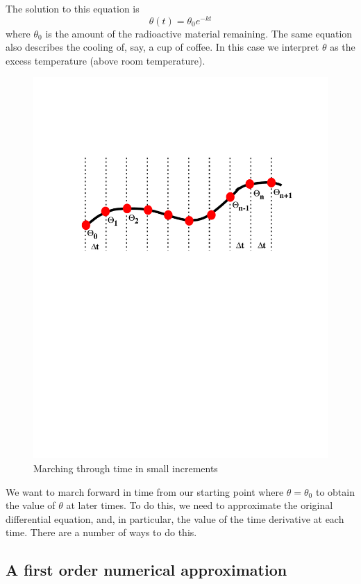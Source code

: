 \documentclass[10pt]{article}
\begin{document}
	The solution to this equation is
		\begin{equation}
			\theta(t) = \theta_0 e^{-kt}
		\end{equation}	
	where $\theta_0$ is the amount of the radioactive material remaining.
	The same equation also describes the cooling of, say, a cup of coffee. In this
	case we interpret $\theta$ as the excess temperature (above room temperature).
	
		\begin{figure}[h]           
			\begin{center}
	 			 \includegraphics[width=0.66\linewidth]{Diagrams/theta_t.pdf}
	 			\caption[]{Marching through time in small increments}
	 		\end{center}
		\end{figure}
	
	We want to march forward in time from our starting point
	where $\theta = \theta_0$ to obtain the value of $\theta$ at
	later times. To do this, we need to approximate the original
	differential equation, and, in particular, the value of the time
	derivative at each time. There are a number of ways to do this.
	
	\subsection{A first order numerical approximation}
	
\end{document}
